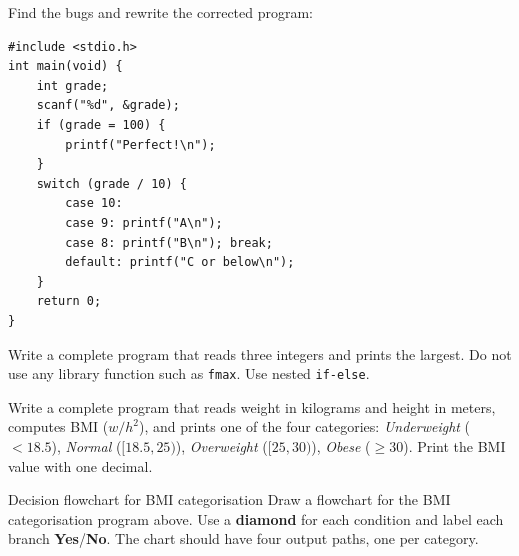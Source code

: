 \documentclass[11pt]{article}
\begin{document}
\begin{bug}
Find the bugs and rewrite the corrected program:
\begin{lstlisting}
#include <stdio.h>
int main(void) {
    int grade;
    scanf("%d", &grade);
    if (grade = 100) {
        printf("Perfect!\n");
    }
    switch (grade / 10) {
        case 10:
        case 9: printf("A\n");
        case 8: printf("B\n"); break;
        default: printf("C or below\n");
    }
    return 0;
}
\end{lstlisting}
\end{bug}

\begin{writecode}
Write a complete program that reads three integers and prints the largest. Do not
use any library function such as \texttt{fmax}. Use nested \texttt{if-else}.
\end{writecode}

\begin{writecode}
Write a complete program that reads weight in kilograms and height in meters,
computes BMI ($w / h^2$), and prints one of the four categories:
\textit{Underweight} ($<18.5$), \textit{Normal} ($[18.5, 25)$), \textit{Overweight}
($[25, 30)$), \textit{Obese} ($\geq 30$). Print the BMI value with one decimal.
\end{writecode}

\begin{drawex}{Decision flowchart for BMI categorisation}
Draw a flowchart for the BMI categorisation program above.
Use a \textbf{diamond} for each condition and label each branch \textbf{Yes}/\textbf{No}.
The chart should have four output paths, one per category.
\end{drawex}
\end{document}
